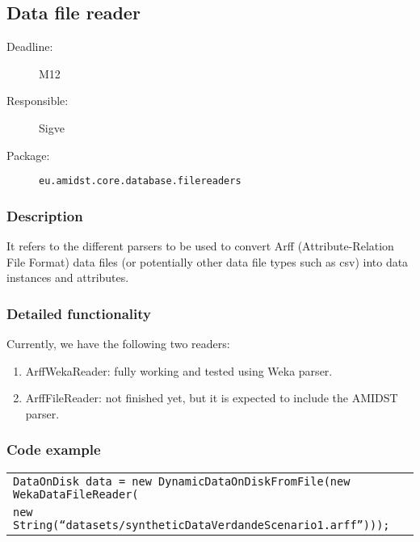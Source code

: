 \newpage
\subsection{Data file reader}
\label{DataFileReader:ID}

\begin{description}
\item[Deadline:] M12
\item[Responsible:] Sigve
\item[Package:] \texttt{eu.amidst.core.database.filereaders}
\end{description}

\subsubsection*{Description}

It refers to the different parsers to be used to convert Arff (Attribute-Relation File Format) data files (or potentially other data file types such as csv) into data instances and attributes.
\subsubsection*{Detailed functionality}

Currently, we have the following two readers:

\begin{enumerate}
\item ArffWekaReader: fully working and tested using Weka parser.
\item ArffFileReader: not finished yet, but it is expected to include the AMIDST parser.
\end{enumerate}


\subsubsection*{Code example}

\begin{table}[H]
\begin{tabular}{l} \hline
        \texttt{DataOnDisk data = new DynamicDataOnDiskFromFile(new WekaDataFileReader(} \\
        \texttt{new String(``datasets/syntheticDataVerdandeScenario1.arff'')));}\\ \hline
\end{tabular}
\end{table}